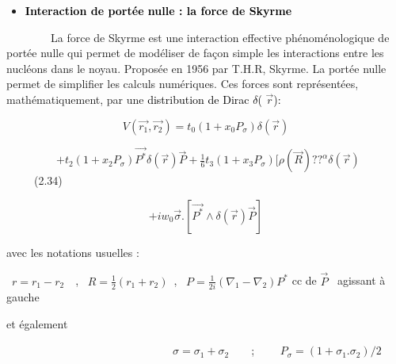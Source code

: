 \documentclass[a4paper]{article}
\begin{document}
\bigskip

\begin{itemize}
\item \textbf{\textcolor{black}{Interaction de portée nulle : la force de Skyrme}}
\end{itemize}

\bigskip

\textcolor[rgb]{0.13725491,0.12156863,0.1254902}{\ \ \ \ \ \ \ \ La force de Skyrme est une interaction effective
phénoménologique de portée nulle qui permet de modéliser de façon simple les interactions entre les nucléons dans le
noyau. Proposée en 1956 par T.H.R, Skyrme. }La portée nulle permet de simplifier les calculs numériques. Ces forces
sont représentées, mathématiquement, par une \textcolor{black}{distribution de Dirac $\delta $(} $\overrightarrow
r$\textcolor{black}{):}


\bigskip

\begin{equation*}
V\left(\overrightarrow{r_1},\overrightarrow{r_2}\right)=t_0(1+x_0P_{\sigma })\delta (\overrightarrow r)
\end{equation*}

\bigskip

\ \ \ \ \ \ \ \ \  $+t_2\left(1+x_2P_{\sigma }\right)\overrightarrow{P^{\ast }}\delta \left(\overrightarrow
r\right)\overrightarrow P+\frac 1 6t_3(1+x_3P_{\sigma })[\rho (\overrightarrow R)??^{\alpha }\delta
\left(\overrightarrow r\right)$\ \ \ \ \ (2.34)


\bigskip

\begin{equation*}
+iw_0\overrightarrow{\sigma }.[\overrightarrow{P^{\ast }}{\wedge}\delta \left(\overrightarrow r\right)\overrightarrow P]
\end{equation*}

\bigskip


\bigskip

avec les notations usuelles :


\bigskip

\  $r=r_1-r_2$\ \ , \  $R=\frac 1 2(r_1+r_2)$~, \  $P=\frac 1{2i}({\nabla}_1-{\nabla}_2)P^{\ast }$ cc de 
$\overrightarrow P$ \ agissant à gauche


\bigskip

et également~~


\bigskip

\ \ \ \ \ \ \ \ \ \ \ \ \ \ \ \ \ \ \ \ \ \ \ \ \ \ \ \ \ \  $\sigma =\sigma _1+\sigma _2$\ \ \ \ ; \ \ \ \  $P_{\sigma
}=(1+\sigma _1.\sigma _2)/2$\ \ \ \ 
\end{document}

